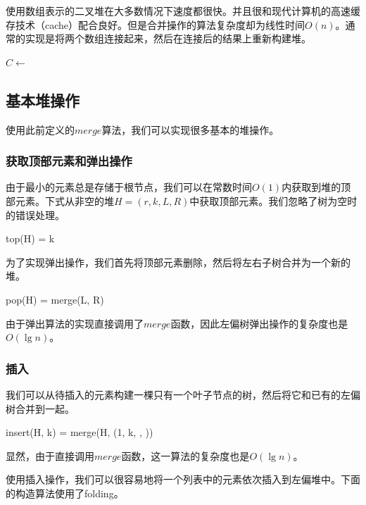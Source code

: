 \documentclass[b5paper]{ctexart}
\begin{document}
使用数组表示的二叉堆在大多数情况下速度都很快。并且很和现代计算机的高速缓存技术（cache）配合良好。但是合并操作的算法复杂度却为线性时间$O(n)$。通常的实现是将两个数组连接起来，然后在连接后的结果上重新构建堆\cite{NIST}。

\begin{algorithmic}[1]
  \State $C \gets$ 
  \State {}
\EndFunction
\end{algorithmic}

\subsection{基本堆操作}

使用此前定义的$merge$算法，我们可以实现很多基本的堆操作。

\subsubsection{获取顶部元素和弹出操作}

由于最小的元素总是存储于根节点，我们可以在常数时间$O(1)$内获取到堆的顶部元素。下式从非空的堆$H = (r, k, L, R)$中获取顶部元素。我们忽略了树为空时的错误处理。

\be
top(H) = k
\ee

为了实现弹出操作，我们首先将顶部元素删除，然后将左右子树合并为一个新的堆。

\be
pop(H) = merge(L, R)
\ee

由于弹出算法的实现直接调用了$merge$函数，因此左偏树弹出操作的复杂度也是$O(\lg n)$。

\subsubsection{插入}

我们可以从待插入的元素构建一棵只有一个叶子节点的树，然后将它和已有的左偏树合并到一起。

\be
insert(H, k) = merge(H, (1, k, \phi, \phi))
\ee

显然，由于直接调用$merge$函数，这一算法的复杂度也是$O(\lg n)$。

使用插入操作，我们可以很容易地将一个列表中的元素依次插入到左偏堆中。下面的构造算法使用了folding。
\end{document}

